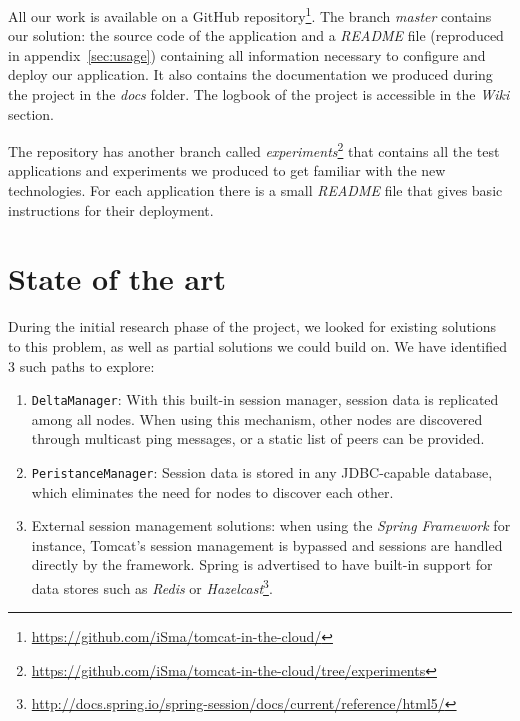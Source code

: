 \documentclass[11pt,a4paper]{article}
\begin{document}
All our work is available on a GitHub repository\footnote{\url{https://github.com/iSma/tomcat-in-the-cloud/}}. The branch \emph{master} contains our solution: the source code of the application and a \emph{README} file (reproduced in appendix~\ref{sec:usage}) containing all information necessary to configure and deploy our application. It also contains the documentation we produced during the project in the \emph{docs} folder. The logbook of the project is accessible in the \emph{Wiki} section.

The repository has another branch called \emph{experiments}\footnote{\url{https://github.com/iSma/tomcat-in-the-cloud/tree/experiments}} that contains all the test applications and experiments we produced to get familiar with the new technologies. For each application there is a small \emph{README} file that gives basic instructions for their deployment.



\section{State of the art}

During the initial research phase of the project, we looked for existing solutions to this problem, as well as partial solutions we could build on. We have identified 3 such paths to explore:

\begin{enumerate}
\item \texttt{DeltaManager}: With this built-in session manager, session data is replicated among all nodes. When using this mechanism, other nodes are discovered through multicast ping messages, or a static list of peers can be provided.

\item \texttt{PeristanceManager}: Session data is stored in any JDBC-capable database, which eliminates the need for nodes to discover each other.

\item External session management solutions: when using the \emph{Spring Framework}\autocite{spring} for instance, Tomcat's session management is bypassed and sessions are handled directly by the framework. Spring is advertised to have built-in support for data stores such as  \emph{Redis} or \emph{Hazelcast}\footnote{\url{http://docs.spring.io/spring-session/docs/current/reference/html5/}}.
\end{enumerate}
\end{document}
